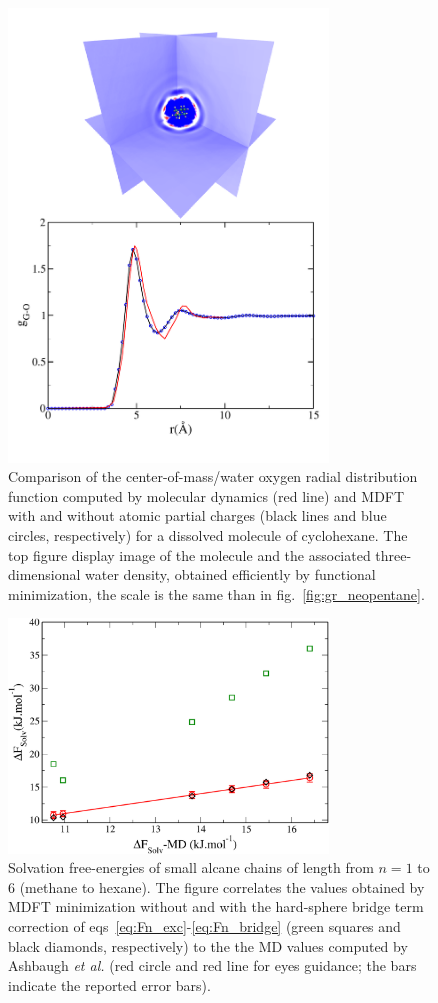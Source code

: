 \documentclass[aip,jcp,preprint]{revtex4-1}
\begin{document}
\begin{figure}
    \includegraphics[width=8.5cm]{cyclohexane_g_and_dens.pdf}
    \caption{
        \label{fig:gr_cyclohexane}
        Comparison of the center-of-mass/water oxygen radial distribution function computed by molecular dynamics (red line) and MDFT
        with and without atomic partial charges (black lines and blue circles, respectively) for a dissolved molecule of cyclohexane. The top figure display image of the molecule and the associated three-dimensional water density, obtained efficiently by functional minimization, the scale is the same than in fig.~\ref{fig:gr_neopentane}.
        }
\end{figure}

\begin{figure}
    \includegraphics[width=8.5cm]{enercomp_alcanes_MD_MDFT.pdf}
    \caption{
        \label{fig:free_energies_alcanes}
        Solvation free-energies of small alcane chains of length from $n=1$ to 6 (methane to hexane). The figure correlates the values obtained by MDFT minimization without and with the hard-sphere bridge term correction of  eqs~\ref{eq:Fn_exc}-\ref{eq:Fn_bridge} (green squares and black diamonds, respectively) to the the MD values computed by Ashbaugh {\em et al.}\cite{ashbaugh_hydration_1998} (red circle and red line for eyes guidance; the bars indicate the reported error bars).         }
\end{figure}
\end{document}
